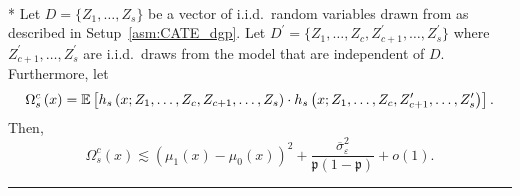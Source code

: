 \newpage
\begin{lem}\label{lem:CATE_omega_sc}\mbox{}\\*
	Let $D = \{Z_1, \dotsc, Z_{s}\}$ be a vector of i.i.d.\ random variables drawn from as described in Setup~\ref{asm:CATE_dgp}.
	Let $D^{\prime} = \{Z_1, \dotsc, Z_{c}, Z_{c+1}^{\prime}, \dotsc,  Z_{s}^{\prime}\}$ where $Z_{c+1}^{\prime}, \dotsc,  Z_{s}^{\prime}$ are i.i.d.\ draws from the model that are independent of $D$.
	Furthermore, let
	\begin{equation}
		\Omega_{s}^{c}\left(x\right)
		= \mathbb{E}\left[h_{s}\left(x; Z_1, \ldots, Z_{c}, Z_{c+1}, \ldots, Z_{s}\right) \cdot
			h_{s}\left(x; Z_1, \ldots,Z_{c}, Z_{c+1}^{\prime}, \ldots, Z_{s}^{\prime}\right)\right].
	\end{equation}
	Then,
	\begin{equation}
		\Omega_{s}^{c}\left(x\right)
		\lesssim \left(\mu_{1}\left(x\right) - \mu_{0}\left(x\right)\right)^2
		+ \frac{\overline{\sigma}^2_{\varepsilon}}{\mathfrak{p}\left(1 - \mathfrak{p}\right)} + o(1).
	\end{equation}
\end{lem}
\hrule
